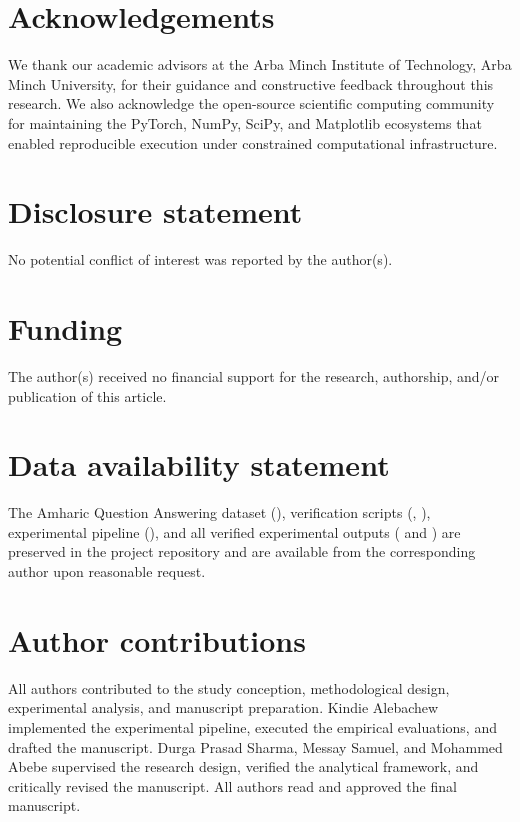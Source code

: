\documentclass{interact}
\begin{document}
\section*{Acknowledgements}
We thank our academic advisors at the Arba Minch Institute of Technology, Arba Minch University, for their guidance and constructive feedback throughout this research. We also acknowledge the open-source scientific computing community for maintaining the PyTorch, NumPy, SciPy, and Matplotlib ecosystems that enabled reproducible execution under constrained computational infrastructure.

\section*{Disclosure statement}
No potential conflict of interest was reported by the author(s).

\section*{Funding}
The author(s) received no financial support for the research, authorship, and/or publication of this article.

\section*{Data availability statement}
The Amharic Question Answering dataset (), verification scripts (, ), experimental pipeline (), and all verified experimental outputs ( and ) are preserved in the project repository and are available from the corresponding author upon reasonable request.

\section*{Author contributions}
All authors contributed to the study conception, methodological design, experimental analysis, and manuscript preparation. Kindie Alebachew implemented the experimental pipeline, executed the empirical evaluations, and drafted the manuscript. Durga Prasad Sharma, Messay Samuel, and Mohammed Abebe supervised the research design, verified the analytical framework, and critically revised the manuscript. All authors read and approved the final manuscript.
\end{document}
